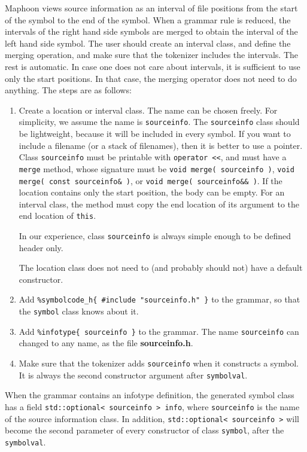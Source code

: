 \documentclass{article}
\begin{document}
Maphoon views source information as an interval of file
positions from the start of the symbol to the end of the symbol.
When a grammar rule is reduced, the intervals of the right
hand side symbols are merged to obtain the interval of the left
hand side symbol. The user should create an interval class, 
and define the merging operation, and make sure that
the tokenizer includes the intervals.  The rest is automatic. 
In case one does not care about intervals, it is sufficient
to use only the start positions. In that case,
the merging operator does not need to do anything.
The steps are as follows:
\begin{enumerate}
\item
   Create a location or interval class. 
   The name can be chosen freely. For simplicity,
   we assume the name is \verb+sourceinfo+. 
   The \verb+sourceinfo+ class should be lightweight,
   because it will be included in every symbol.
   If you want to include a filename (or a stack of filenames),
   then it is better to use a pointer. 
   Class \verb+sourceinfo+ must be printable with \verb+operator <<+, 
   and must have a \verb+merge+ method, whose
   signature must be \verb+void merge( sourceinfo )+,
   \verb+void merge( const sourceinfo& )+, or
   \verb+void merge( sourceinfo&& )+. 
   If the location contains only the start position,
   the body can be empty.
   For an interval class, the method must copy the end location
   of its argument to the end location of \verb+this+.

   In our experience, class \verb+sourceinfo+ is always simple enough
   to be defined header only. 

   The location class does not need to (and probably should not)
   have a default constructor. 
\item
   Add \verb+%symbolcode_h{ #include "sourceinfo.h" }+ to the grammar,
   so that the \verb+symbol+ class knows about it.
\item
   Add \verb+%infotype{ sourceinfo }+ to the grammar. 
   The name \verb|sourceinfo| can changed to any name,
   as the file {\bf sourceinfo.h}.  
\item
   Make sure that the tokenizer adds \verb+sourceinfo+
   when it constructs a symbol. It is always the
   second constructor argument after \verb+symbolval+. 
\end{enumerate}

\noindent
When the grammar contains an infotype definition, the generated symbol class 
has a field 
\verb+std::optional< sourceinfo > info+, where \verb+sourceinfo+
is the name of the source information class. 
In addition, \verb+std::optional< sourceinfo >+ will become 
the second parameter
of every constructor of class \verb+symbol+,
after the \verb+symbolval+.
\end{document}
